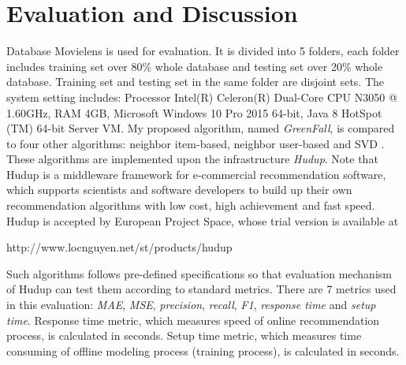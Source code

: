 \documentclass{article}
\begin{document}
\section{Evaluation and Discussion} \label{section:evaluation}
Database Movielens \cite{groupLens:movielens} is used for evaluation. It is divided into 5 folders, each folder includes training set over 80\% whole database and testing set over 20\% whole database. Training set and testing set in the same folder are disjoint sets. The system setting includes: Processor Intel(R) Celeron(R) Dual-Core CPU N3050 @ 1.60GHz, RAM 4GB, Microsoft Windows 10 Pro 2015 64-bit, Java 8 HotSpot (TM) 64-bit Server VM. My proposed algorithm, named \textit{GreenFall}, is compared to four other algorithms: neighbor item-based, neighbor user-based and SVD \cite[pp.~151-152]{ricci:recommender}. These algorithms are implemented upon the infrastructure \textit{Hudup}. Note that Hudup is a middleware framework for e-commercial recommendation software, which supports scientists and software developers to build up their own recommendation algorithms with low cost, high achievement and fast speed. Hudup is accepted by European Project Space, whose trial version is available at

http://www.locnguyen.net/st/products/hudup

Such algorithms follows pre-defined specifications so that evaluation mechanism of Hudup can test them according to standard metrics. There are 7 metrics \cite[pp.~19-39]{herlocker:evaluation} used in this evaluation: \textit{MAE}, \textit{MSE}, \textit{precision}, \textit{recall}, \textit{F1}, \textit{response time} and \textit{setup time}. Response time metric, which measures speed of online recommendation process, is calculated in seconds. Setup time metric, which measures time consuming of offline modeling process (training process), is calculated in seconds.
\end{document}
